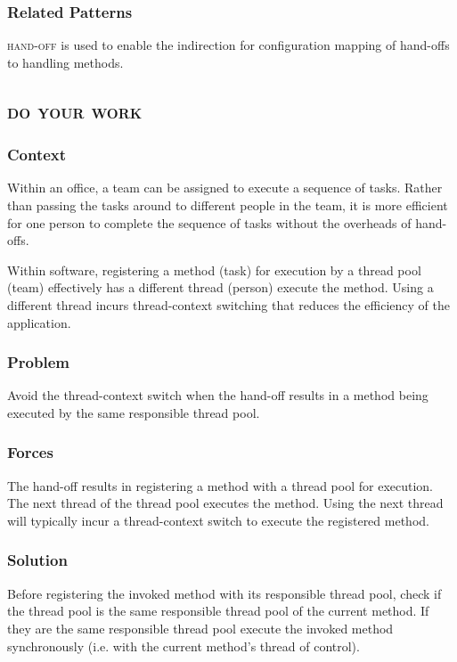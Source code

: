 \documentclass[prodmode]{style/acmlarge}
\begin{document}
\subsubsection*{Related Patterns} \textsc{hand-off} is used to enable the
indirection for configuration mapping of hand-offs to handling methods.




\subsection{\textsc{\textbf{do your work}}}

\subsubsection*{Context} Within an office, a team can be assigned to execute a
sequence of tasks.  Rather than passing the tasks around to different people in
the team, it is more efficient for one person to complete the sequence of tasks
without the overheads of hand-offs.

Within software, registering a method (task) for execution by a thread pool
(team) effectively has a different thread (person) execute the method.  Using a
different thread incurs thread-context switching that reduces the efficiency of
the application.

\subsubsection*{\textbf{Problem}} Avoid the thread-context switch when the hand-off
results in a method being executed by the same responsible thread pool.

\subsubsection*{Forces} The hand-off results in registering a method with a
thread pool for execution.  The next thread of the thread pool executes the
method.  Using the next thread will typically incur a thread-context switch to
execute the registered method.

\subsubsection*{\textbf{Solution}} Before registering the invoked method with its
responsible thread pool, check if the thread pool is the same responsible thread
pool of the current method.  If they are the same responsible thread pool
execute the invoked method synchronously (i.e. with the current method's thread
of control).
\end{document}
